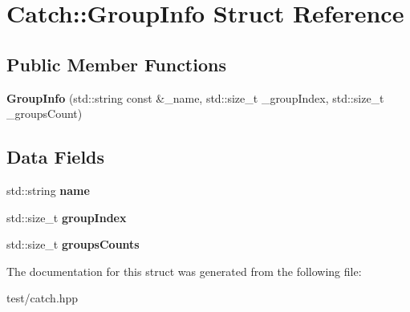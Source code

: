 \hypertarget{structCatch_1_1GroupInfo}{}\section{Catch\+:\+:Group\+Info Struct Reference}
\label{structCatch_1_1GroupInfo}
\subsection*{Public Member Functions}
\begin{DoxyCompactItemize}
\item 
{\bfseries Group\+Info} (std\+::string const \&\+\_\+name, std\+::size\+\_\+t \+\_\+group\+Index, std\+::size\+\_\+t \+\_\+groups\+Count)\hypertarget{structCatch_1_1GroupInfo_a608ac0388b6f55def5908d464c1c1e24}{}\label{structCatch_1_1GroupInfo_a608ac0388b6f55def5908d464c1c1e24}

\end{DoxyCompactItemize}
\subsection*{Data Fields}
\begin{DoxyCompactItemize}
\item 
std\+::string {\bfseries name}\hypertarget{structCatch_1_1GroupInfo_a9297e37e27c4e5fd207cfa709f500967}{}\label{structCatch_1_1GroupInfo_a9297e37e27c4e5fd207cfa709f500967}

\item 
std\+::size\+\_\+t {\bfseries group\+Index}\hypertarget{structCatch_1_1GroupInfo_a1ecdd754e485375ea04ed6153284d987}{}\label{structCatch_1_1GroupInfo_a1ecdd754e485375ea04ed6153284d987}

\item 
std\+::size\+\_\+t {\bfseries groups\+Counts}\hypertarget{structCatch_1_1GroupInfo_a99144c7e35b86792dbf922f636629330}{}\label{structCatch_1_1GroupInfo_a99144c7e35b86792dbf922f636629330}

\end{DoxyCompactItemize}


The documentation for this struct was generated from the following file\+:\begin{DoxyCompactItemize}
\item 
test/catch.\+hpp\end{DoxyCompactItemize}
